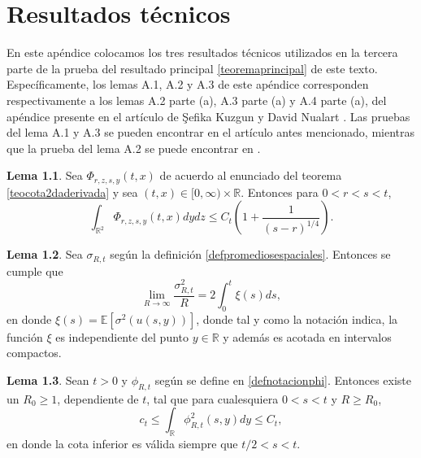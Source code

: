 \documentclass[letterpaper,twoside,12pt]{book}
\newcommand{\R}{\mathbb{R}}
\newcommand{\E}{\mathbb{E}}
\newcommand{\1}{\mathds{1}}
\renewcommand{\to}{\rightarrow}
\theoremstyle{definition}
\theoremstyle{definition}
\theoremstyle{remark}
\theoremstyle{definition}
\theoremstyle{definition}
\theoremstyle{definition}
\theoremstyle{definition}
\theoremstyle{definition}
\newtheorem{lema}{Lema}
\begin{document}
\chapter{Resultados técnicos}
En este apéndice colocamos los tres resultados técnicos utilizados en la tercera parte de la prueba del resultado principal \ref{teoremaprincipal} de este texto.  Específicamente, los lemas A.1, A.2 y A.3 de este apéndice corresponden respectivamente a los lemas A.2 parte (a), A.3 parte (a) y A.4 parte (a), del apéndice presente en el artículo de \c{S}efika Kuzgun y David Nualart \cite{KUZGUN202268}. Las pruebas del lema A.1 y A.3 se pueden encontrar en el artículo antes mencionado, mientras que la prueba del lema A.2 se puede encontrar en \cite[proposición 3.1]{HUANG20207170}.

\begin{lema}\label{lemaA.2}
 Sea $\Phi_{r,z,s,y}(t,x)$ de acuerdo al enunciado del teorema \ref{teocota2daderivada} y sea $(t,x)\in [0,\infty)\times\R$. Entonces para $0<r<s<t$,
 \[
 \int_{\R^2}\Phi_{r,z,s,y}(t,x)dydz\leq C_t \left(1+\frac{1}{(s-r)^{1/4}}\right).
 \]
 \end{lema}
 \begin{lema}\label{lemaA.3a} 
  Sea $\sigma_{R,t}$ según la definición \ref{defpromediosespaciales}. Entonces se cumple que 
  \[
      \lim_{R\to\infty}\frac{\sigma_{R,t}^2}{R}=2\int_{0}^{t}\xi(s)ds,
  \] 
  en donde $\xi(s)=\E\left[\sigma^2(u(s,y))\right]$, donde tal y como la notación indica, la función $\xi$ es independiente del punto $y\in \R$ y además es acotada en intervalos compactos.
  \end{lema}
  \begin{lema}\label{LemaA.4a}
   Sean $t>0$ y $\phi_{R,t}$ según se define en \eqref{defnotacionphi}. Entonces existe un $R_0\geq1$, dependiente de $t$, tal que para cualesquiera $0<s<t$ y $R\geq R_0$,
   \[
      c_t\leq \int_\R\phi_{R,t}^2(s,y)dy\leq C_t,
   \]
   en donde la cota inferior es válida siempre que $t/2<s<t$.
  \end{lema}
\nocite{*}
\backmatter


\end{document}
